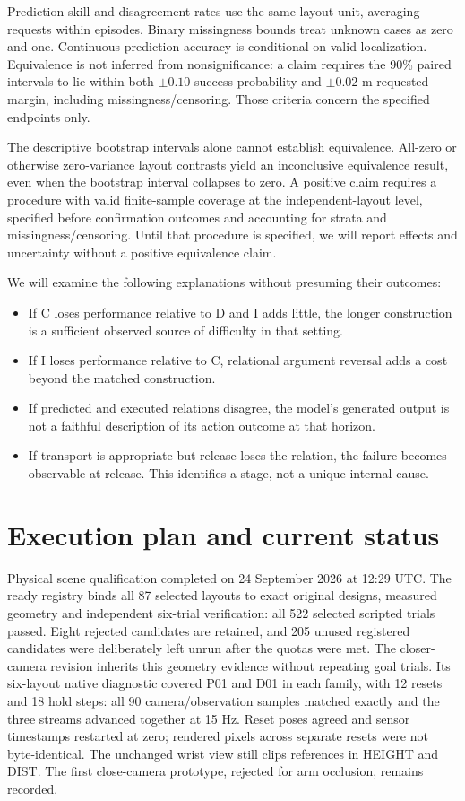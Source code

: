 \documentclass[11pt]{article}
\begin{document}
Prediction skill and disagreement rates use the same layout unit, averaging requests within episodes. Binary missingness bounds treat unknown cases as zero and one. Continuous prediction accuracy is conditional on valid localization. Equivalence is not inferred from nonsignificance: a claim requires the 90\% paired intervals to lie within both $\pm0.10$ success probability and $\pm0.02$ m requested margin, including missingness/censoring. Those criteria concern the specified endpoints only.

The descriptive bootstrap intervals alone cannot establish equivalence. All-zero or otherwise zero-variance layout contrasts yield an inconclusive equivalence result, even when the bootstrap interval collapses to zero. A positive claim requires a procedure with valid finite-sample coverage at the independent-layout level, specified before confirmation outcomes and accounting for strata and missingness/censoring. Until that procedure is specified, we will report effects and uncertainty without a positive equivalence claim.

We will examine the following explanations without presuming their outcomes:
\begin{itemize}
\item If C loses performance relative to D and I adds little, the longer construction is a sufficient observed source of difficulty in that setting.
\item If I loses performance relative to C, relational argument reversal adds a cost beyond the matched construction.
\item If predicted and executed relations disagree, the model's generated output is not a faithful description of its action outcome at that horizon.
\item If transport is appropriate but release loses the relation, the failure becomes observable at release. This identifies a stage, not a unique internal cause.
\end{itemize}



\section{Execution plan and current status}
Physical scene qualification completed on 24 September 2026 at 12:29 UTC. The ready registry binds all 87 selected layouts to exact original designs, measured geometry and independent six-trial verification: all 522 selected scripted trials passed. Eight rejected candidates are retained, and 205 unused registered candidates were deliberately left unrun after the quotas were met. The closer-camera revision inherits this geometry evidence without repeating goal trials. Its six-layout native diagnostic covered P01 and D01 in each family, with 12 resets and 18 hold steps: all 90 camera/observation samples matched exactly and the three streams advanced together at 15 Hz. Reset poses agreed and sensor timestamps restarted at zero; rendered pixels across separate resets were not byte-identical. The unchanged wrist view still clips references in HEIGHT and DIST. The first close-camera prototype, rejected for arm occlusion, remains recorded.
\end{document}
